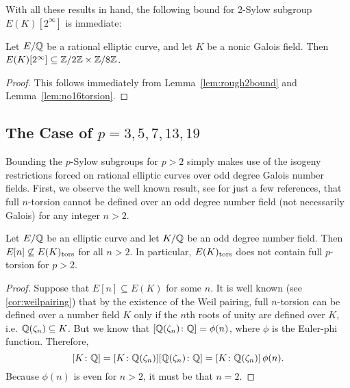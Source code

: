 With all these results in hand, the following bound for 2-Sylow subgroup $E(K)[2^\infty]$ is immediate:


\begin{prop} \label{2sylowbound}
Let $E/\mathbb{Q}$ be a rational elliptic curve, and let $K$ be a nonic Galois field. Then $E(K)[2^\infty] \subseteq \mathbb{Z}/2\mathbb{Z} \times \mathbb{Z}/8\mathbb{Z}$. 
\end{prop}

\begin{proof}
This follows immediately from Lemma~\ref{lem:rough2bound} and Lemma~\ref{lem:no16torsion}. 
\end{proof}



\subsection{The Case of $p= 3, 5, 7, 13, 19$\label{sec:noniccases}}

Bounding the $p$-Sylow subgroups for $p > 2$ simply makes use of the isogeny restrictions forced on rational elliptic curves over odd degree Galois number fields. First, we observe the well known result, see \cite{najman16,chou16,gonzalezjimenez17,chou19,guzvic19} for just a few references, that full $n$-torsion cannot be defined over an odd degree number field (not necessarily Galois) for any integer $n > 2$. 


\begin{lem} \label{lem:nofulltorsion}
Let $E/\mathbb{Q}$ be an elliptic curve and let $K/\mathbb{Q}$ be an odd degree number field. Then $E[n] \not\subseteq E(K)_{\text{tors}}$ for all $n > 2$. In particular, $E(K)_{\text{tors}}$ does not contain full $p$-torsion for $p > 2$. 
\end{lem}

\begin{proof}
Suppose that $E[n] \subseteq E(K)$ for some $n$. It is well known (see \ref{cor:weilpairing}) that by the existence of the Weil pairing, full $n$-torsion can be defined over a number field $K$ only if the $n$th roots of unity are defined over $K$, i.e. $\mathbb{Q}(\zeta_n) \subseteq K$. But we know that  $[\mathbb{Q}(\zeta_n) \colon \mathbb{Q}]= \phi(n)$, where $\phi$ is the Euler-phi function. Therefore, 
	\[
	[K \colon \mathbb{Q}]= [K \colon \mathbb{Q}(\zeta_n)] [\mathbb{Q}(\zeta_n) \colon \mathbb{Q}]= [K \colon \mathbb{Q}(\zeta_n)]\, \phi(n). 
	\]
Because $\phi(n)$ is even for $n > 2$, it must be that $n = 2$. 
\end{proof}  


